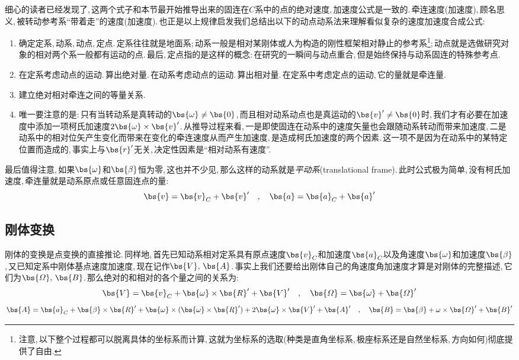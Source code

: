 细心的读者已经发现了,\,这两个式子和本节最开始推导出来的固连在$C$系中的点的绝对速度,\,加速度公式是一致的.\,牵连速度(加速度),\,顾名思义,\,被转动参考系``带着走''的速度(加速度).\,也正是以上规律启发我们总结出以下的动点动系法来理解看似复杂的速度加速度合成公式:
\begin{enumerate}
	\item 确定定系,\,动系,\,动点,\,定点.\,定系往往就是地面系;\,动系一般是相对某刚体或人为构造的刚性框架相对静止的参考系\footnote{注意,\,以下整个过程都可以脱离具体的坐标系而计算,\,这就为坐标系的选取(种类是直角坐标系,\,极座标系还是自然坐标系,\,方向如何)彻底提供了自由.};\,动点就是选做研究对象的相对两个系一般都有运动的点.\,最后,\,定点指的是这样的概念:\,在研究的一瞬间与动点重合,\,但是始终保持与动系固连的特殊参考点.
	\item 在定系考虑动点的运动.\,算出绝对量.\,在动系考虑动点的运动.\,算出相对量.\,在定系中考虑定点的运动,\,它的量就是牵连量.
	\item 建立绝对相对牵连之间的等量关系.
	\item 唯一要注意的是:\,只有当转动系是真转动的$\bs{\omega}\neq\bs{0}$,\,而且相对动系动点也是真运动的$\bs{v}'\neq\bs{0}$时,\,我们才有必要在加速度中添加一项柯氏加速度$2\bs{\omega}\times\bs{v}'$.\,从推导过程来看,\,一是即使固连在动系中的速度矢量也会跟随动系转动而带来加速度,\,二是动系中的相对位矢产生变化而带来在变化的牵连速度从而产生加速度,\,是造成柯氏加速度的两个因素.\,这一项不是因为在动系中的某特定位置而造成的,\,事实上与$\bs{r}'$无关,\,决定性因素是``相对动系有速度''.
\end{enumerate}

最后值得注意,\,如果$\bs{\omega}$和$\bs{\beta}$恒为零,\,这也并不少见,\,那么这样的动系就是\emph{平动系}(translational frame).\,此时公式极为简单,\,没有柯氏加速度,\,牵连量就是动系原点或任意固连点的量:
\[\bs{v}=\bs{v}_C+\bs{v}'\quad,\quad \bs{a}=\bs{a}_C+\bs{a}'\]

\subsection{刚体变换}

刚体的变换是点变换的直接推论.\,同样地,\,首先已知动系相对定系具有原点速度$\bs{v}_C$和加速度$\bs{a}_C$以及角速度$\bs{\omega}$和加速度$\bs{\beta}$,\,又已知定系中刚体基点速度加速度,\,现在记作$\bs{V},\,\bs{A}$.\,事实上我们还要给出刚体自己的角速度角加速度才算是对刚体的完整描述,\,它们为$\bs{\varOmega},\,\bs{B}$.\,那么绝对的和相对的各个量之间的关系为:
\[\bs{V}=\bs{v}_C+\bs{\omega}\times\bs{R}'+\bs{V}'\quad,\quad \bs{\varOmega}=\bs{\omega}+\bs{\varOmega}'\]
\[\bs{A}=\bs{a}_C+\bs{\beta}\times\bs{R}'+\bs{\omega}\times(\bs{\omega}\times\bs{R}')+2\bs{\omega}\times\bs{V}'+\bs{A}'\quad,\quad \bs{B}=\bs{\beta}+\omega\times\bs{\varOmega}'+\bs{B}'\]

